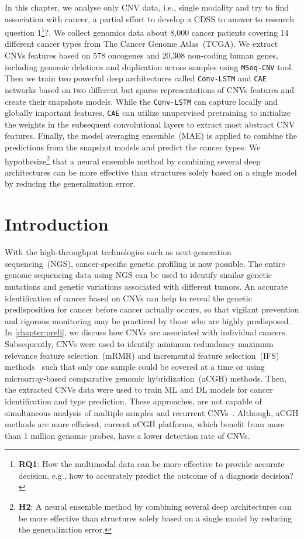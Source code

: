 \hspace*{3.5mm} In this chapter, we analyse only CNV data, i.e., single modality and try to find association with cancer, a partial effort to develop a CDSS to answer to research question 1\footnote{\textbf{RQ1}: How the multimodal data can be more effective to provide accurate decision, e.g., how to accurately predict the outcome of a diagnosis decision?}?. We collect genomics data about 8,000 cancer patients covering 14 different cancer types from The Cancer Genome Atlas~(TCGA). We extract CNVs features based on 578 oncogenes and 20,308 non-coding human genes, including genomic deletions and duplication across samples using \texttt{MSeq-CNV} tool. Then we train two powerful deep architectures called \texttt{Conv-LSTM} and \texttt{CAE} networks based on two different but sparse representations of CNVs features and create their snapshots models. While the \texttt{Conv-LSTM} can capture locally and globally important features, \texttt{CAE} can utilize unupervised pretraining to initialize the weights in the subsequent convolutional layers to extract most abstract CNV features. Finally, the model averaging ensemble~(MAE) is applied to combine the predictions from the snapshot models and predict the cancer types. We hypothesize\footnote{\textbf{H2}: A neural ensemble method by combining several deep architectures can be more effective than structures solely based on a single model by reducing the generalization error.} that a neural ensemble method by combining several deep architectures can be more effective than structures solely based on a single model by reducing the generalization error.  


\section{Introduction}
With the high-throughput technologies such as next-generation sequencing~(NGS), cancer-specific genetic profiling is now possible. The entire genome sequencing data using NGS can be used to identify similar genetic mutations and genetic variations associated with different tumors. An accurate identification of cancer based on CNVs can help to reveal the genetic predisposition for cancer before cancer actually occurs, so that vigilant prevention and rigorous monitoring may be practiced by those who are highly predisposed. In \cref{chapter:preli}, we discuss how CNVs are associated with individual cancers. Subsequently, CNVs were used to identify minimum redundancy maximum relevance feature selection~(mRMR) and incremental feature selection~(IFS) methods~\cite{zhang2016classification} such that only one sample could be covered at a time or using microarray-based comparative genomic hybridization~(aCGH) methods. Then, the extracted CNVs data were used to train ML and DL models for cancer identification and type prediction. These approaches, are not capable of simultaneous analysis of multiple samples and recurrent CNVs~\cite{malekpour2018mseq}. Although, aCGH methods are more efficient, current aCGH platforms, which benefit from more than 1 million genomic probes, have a lower detection rate of CNVs. 

